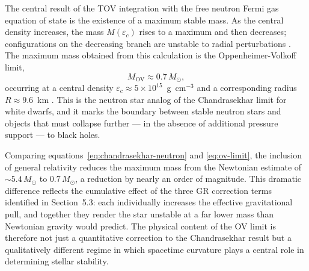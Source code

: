 The central result of the TOV integration with the free neutron Fermi
gas equation of state is the existence of a maximum stable mass. As the
central density increases, the mass $M(\varepsilon_c)$ rises to a
maximum and then decreases; configurations on the decreasing branch are
unstable to radial perturbations \cite{shapiro_teukolsky_1983}. The maximum mass
obtained from this calculation is the Oppenheimer-Volkoff limit,
%
\begin{equation}
    M_{\mathrm{OV}} \approx 0.7\, M_\odot,
    \label{eq:ov-limit}
\end{equation}
%
occurring at a central density $\varepsilon_c \approx 5 \times 10^{15}$~g~cm$^{-3}$
and a corresponding radius $R \approx 9.6$~km \cite{Oppy}.
This is the neutron star analog of the Chandrasekhar limit for white
dwarfs, and it marks the boundary between stable neutron stars and
objects that must collapse further --- in the absence of additional
pressure support --- to black holes.

Comparing equations~\eqref{eq:chandrasekhar-neutron} and
\eqref{eq:ov-limit}, the inclusion of general relativity reduces the
maximum mass from the Newtonian estimate of $\sim 5.4\,M_\odot$ to
$0.7\,M_\odot$, a reduction by nearly an order of magnitude. This
dramatic difference reflects the cumulative effect of the three GR
correction terms identified in Section~5.3: each individually increases
the effective gravitational pull, and together they render the star
unstable at a far lower mass than Newtonian gravity would predict. The
physical content of the OV limit is therefore not just a quantitative
correction to the Chandrasekhar result but a qualitatively different
regime in which spacetime curvature plays a central role in determining
stellar stability.
